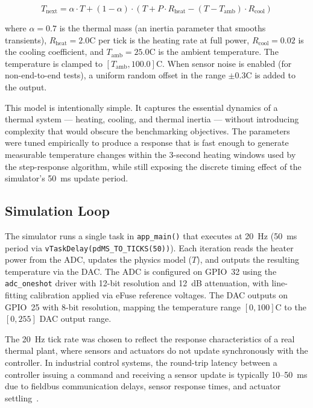 \documentclass[12pt, a4paper]{report}
\begin{document}
\begin{equation}
\label{eq:physics}
T_{\text{next}} = \alpha \cdot T + (1 - \alpha) \cdot \left( T + P \cdot R_{\text{heat}} - (T - T_{\text{amb}}) \cdot R_{\text{cool}} \right)
\end{equation}

\noindent where $\alpha = 0.7$ is the thermal mass (an inertia parameter that smooths transients), $R_{\text{heat}} = 2.0$\textdegree C per tick is the heating rate at full power, $R_{\text{cool}} = 0.02$ is the cooling coefficient, and $T_{\text{amb}} = 25.0$\textdegree C is the ambient temperature. The temperature is clamped to $[T_{\text{amb}}, 100.0]$\textdegree C. When sensor noise is enabled (for non-end-to-end tests), a uniform random offset in the range $\pm 0.3$\textdegree C is added to the output.

This model is intentionally simple. It captures the essential dynamics of a thermal system --- heating, cooling, and thermal inertia --- without introducing complexity that would obscure the benchmarking objectives. The parameters were tuned empirically to produce a response that is fast enough to generate measurable temperature changes within the 3-second heating windows used by the step-response algorithm, while still exposing the discrete timing effect of the simulator's 50~ms update period.

\subsection{Simulation Loop}
\label{subsec:sim-loop}

The simulator runs a single task in \texttt{app\_main()} that executes at 20~Hz (50~ms
period via \texttt{vTaskDelay(pdMS\_TO\_TICKS(50))}). Each iteration reads the heater power
from the ADC, updates the physics model ($T$), and outputs the resulting temperature via the
DAC. The ADC is configured on GPIO~32 using the \texttt{adc\_oneshot} driver with 12-bit
resolution and 12~dB attenuation, with line-fitting calibration applied via eFuse reference
voltages. The DAC outputs on GPIO~25 with 8-bit resolution, mapping the temperature range
$[0, 100]$\textdegree C to the $[0, 255]$ DAC output range.

The 20~Hz tick rate was chosen to reflect the response characteristics of a real thermal
plant, where sensors and actuators do not update synchronously with the controller. In
industrial control systems, the round-trip latency between a controller issuing a command
and receiving a sensor update is typically 10--50~ms due to fieldbus communication
delays, sensor response times, and actuator settling~\cite{sealevel-sampling}.
\end{document}
